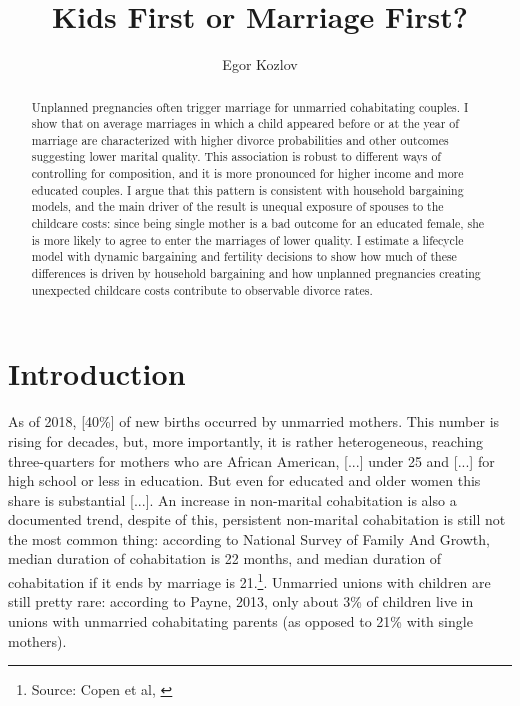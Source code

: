 \documentclass[12pt,letter]{article}
\title{Kids First or Marriage First?}
\author{Egor Kozlov}
\begin{document}
\maketitle



\begin{abstract}
Unplanned pregnancies often trigger marriage for unmarried cohabitating couples. I show that on average marriages in which a child appeared before or at the year of marriage are characterized with higher divorce probabilities and other outcomes suggesting lower marital quality. This association is robust to different ways of controlling for composition, and it is more pronounced for higher income and more educated couples. I argue that this pattern is consistent with household bargaining models, and the main driver of the result is unequal exposure of spouses to the childcare costs: since being single mother is a bad outcome for an educated female, she is more likely to agree to enter the marriages of lower quality. I estimate a lifecycle model with dynamic bargaining and fertility decisions to show how much of these differences is driven by household bargaining and how unplanned pregnancies creating unexpected childcare costs contribute to observable divorce rates.
\end{abstract}

\section{Introduction}
As of 2018, [40\%] of new births occurred by unmarried mothers. This number is rising for decades, but, more importantly, it is rather heterogeneous, reaching three-quarters for mothers who are African American, [...] under 25 and [...] for high school or less in education. But even for educated and older women this share is substantial [...]. An increase in non-marital cohabitation is also a documented trend, despite of this, persistent non-marital cohabitation is still not the most common thing: according to National Survey of Family And Growth, median duration of cohabitation is 22 months, and median duration of cohabitation if it ends by marriage is 21.\footnote{Source: Copen et al, \cite{copen}}. Unmarried unions with children are still pretty rare: according to Payne, 2013\nocite{payne}, only about 3\% of children live in unions with unmarried cohabitating parents (as opposed to 21\% with single mothers). 
\end{document}
